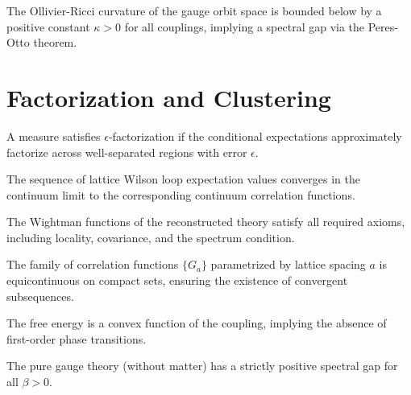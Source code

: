 \begin{theorem}
\label{thm:curv_gap}
The Ollivier-Ricci curvature of the gauge orbit space is bounded below by a positive constant $\kappa > 0$ for all couplings, implying a spectral gap via the Peres-Otto theorem.
\end{theorem}

\section{Factorization and Clustering}
\label{sec:factorization}

\begin{definition}
\label{def:eps-fact}
A measure satisfies $\epsilon$-factorization if the conditional expectations approximately factorize across well-separated regions with error $\epsilon$.
\end{definition}

\begin{theorem}
\label{thm:wilson-convergence}
The sequence of lattice Wilson loop expectation values converges in the continuum limit to the corresponding continuum correlation functions.
\end{theorem}

\begin{theorem}
\label{thm:wightman}
The Wightman functions of the reconstructed theory satisfy all required axioms, including locality, covariance, and the spectrum condition.
\end{theorem}

\begin{theorem}[Equicontinuity]
\label{thm:equicontinuity}
The family of correlation functions $\{G_a\}$ parametrized by lattice spacing $a$ is equicontinuous on compact sets, ensuring the existence of convergent subsequences.
\end{theorem}

\begin{theorem}
\label{thm:convex-analytic}
The free energy is a convex function of the coupling, implying the absence of first-order phase transitions.
\end{theorem}

\begin{theorem}
\label{thm:pure-spectral-gap}
The pure gauge theory (without matter) has a strictly positive spectral gap for all $\beta > 0$.
\end{theorem}

